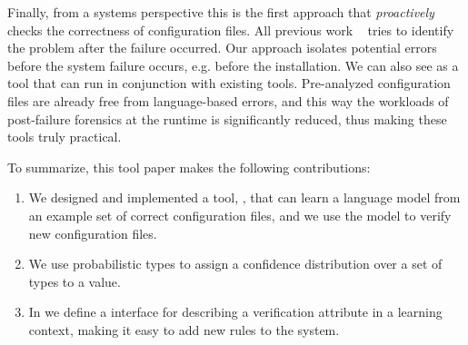 Finally, from a systems perspective this is the first approach 
that {\emph{proactively}} checks 
 the correctness of configuration files. All previous work
~\cite{xu15systems,zhang14encore,yuan11context, wang04automatic,attariyan10automating,
su07autobash,whitaker04configuration} tries to identify the problem after the
failure occurred. Our approach isolates potential errors before the system failure occurs, e.g. before the installation. We can also see \app as a tool that can run in conjunction with existing tools. Pre-analyzed configuration files are already free from language-based errors, and this way the workloads of post-failure forensics at the runtime
is significantly reduced, thus making these tools truly practical.

To summarize, this tool paper makes the following contributions:

\begin{enumerate}

  \item We designed and implemented a tool, \app, that can learn a
language model from an example set of correct configuration files, and
we use the model to verify new configuration files.
  \item We use probabilistic types to assign a confidence distribution over a set of types to a value.
  \item In \app we define a interface for describing a verification attribute in a learning context, making it easy to add new rules to the system.

\end{enumerate}
